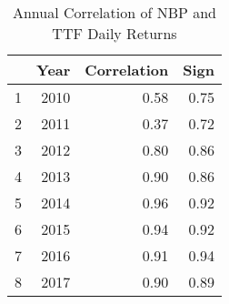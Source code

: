 \begin{table}[ht]
\centering
\begin{tabular}{rrrr}
  \hline
 & Year & Correlation & Sign \\ 
  \hline
1 & 2010 & 0.58 & 0.75 \\ 
  2 & 2011 & 0.37 & 0.72 \\ 
  3 & 2012 & 0.80 & 0.86 \\ 
  4 & 2013 & 0.90 & 0.86 \\ 
  5 & 2014 & 0.96 & 0.92 \\ 
  6 & 2015 & 0.94 & 0.92 \\ 
  7 & 2016 & 0.91 & 0.94 \\ 
  8 & 2017 & 0.90 & 0.89 \\ 
   \hline
\end{tabular}
\caption{Annual Correlation of NBP and TTF Daily Returns} 
\label{tab:nbp_ttf_return_corr_annual}
\end{table}
